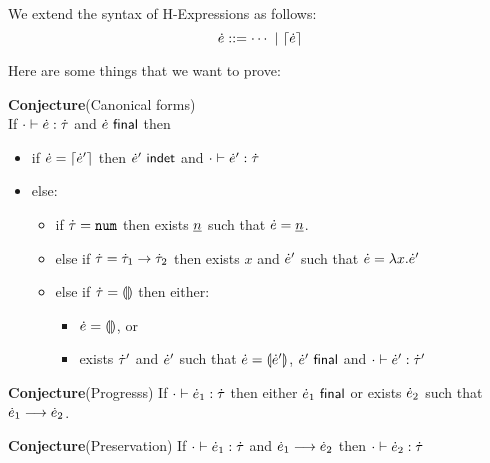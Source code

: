 %
%
%

We extend the syntax of H-Expressions as follows:
\[
\dot{e} ::= \cdots~|~\lceil\dot{e}\rceil
\]

Here are some things that we want to prove:

\textbf{Conjecture}(Canonical forms)
\\
If $\cdot \vdash \dot{e} : \dot{\tau}$
and $\dot{e}~\textsf{final}$ then
\begin{itemize}
\item if $\dot{e} = \lceil\dot{e}'\rceil$ then $\dot{e}'~\textsf{indet}$ and $\cdot \vdash \dot{e}' : \dot{\tau}$
\item else:
\begin{itemize}
\item if $\dot{\tau} = \texttt{num}$ then exists $\underline{n}$ such that $\dot{e} = \underline{n}$.
\item else if $\dot{\tau} = \dot{\tau}_1 \rightarrow \dot{\tau}_2$ then exists $x$ and $\dot{e}'$ such that $\dot{e} = \lambda x.\dot{e}'$
\item else if $\dot{\tau} = \llparenthesis\rrparenthesis$ then either:
\begin{itemize}
\item $\dot{e} = \llparenthesis\rrparenthesis$, or
\item exists $\dot{\tau}'$ and $\dot{e}'$ such that $\dot{e} = \llparenthesis\dot{e}'\rrparenthesis$, $\dot{e}'~\textsf{final}$ and $\cdot \vdash \dot{e}' : \dot{\tau}'$
\end{itemize}
\end{itemize}
\end{itemize}

\textbf{Conjecture}(Progresss)
If $\cdot \vdash \dot{e}_1 : \dot{\tau}$
then either $\dot{e}_1~\textsf{final}$
or exists $\dot{e}_2$ such that $\dot{e}_1 \longrightarrow \dot{e}_2$.

\textbf{Conjecture}(Preservation)
If $\cdot\vdash \dot{e}_1 : \dot{\tau}$ 
and $\dot{e}_1 \longrightarrow \dot{e}_2$
then $\cdot \vdash \dot{e}_2 : \dot{\tau}$
